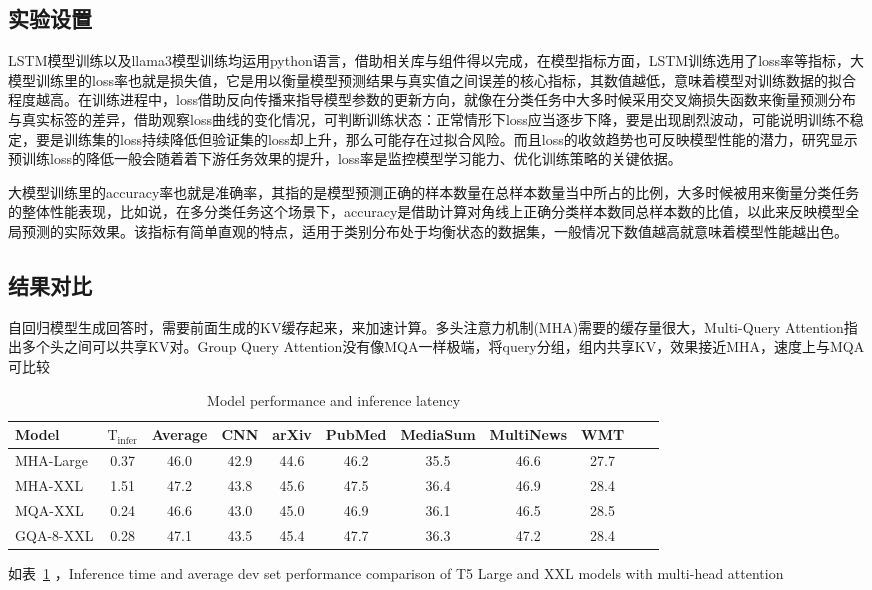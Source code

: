 \documentclass[12pt, a4paper]{article}
\begin{document}
\subsection{实验设置}
LSTM模型训练以及llama3模型训练均运用python语言，借助相关库与组件得以完成，在模型指标方面，LSTM训练选用了loss率等指标，大模型训练里的loss率也就是损失值，它是用以衡量模型预测结果与真实值之间误差的核心指标，其数值越低，意味着模型对训练数据的拟合程度越高。在训练进程中，loss借助反向传播来指导模型参数的更新方向，就像在分类任务中大多时候采用交叉熵损失函数来衡量预测分布与真实标签的差异，借助观察loss曲线的变化情况，可判断训练状态：正常情形下loss应当逐步下降，要是出现剧烈波动，可能说明训练不稳定，要是训练集的loss持续降低但验证集的loss却上升，那么可能存在过拟合风险。而且loss的收敛趋势也可反映模型性能的潜力，研究显示预训练loss的降低一般会随着着下游任务效果的提升，loss率是监控模型学习能力、优化训练策略的关键依据。


大模型训练里的accuracy率也就是准确率，其指的是模型预测正确的样本数量在总样本数量当中所占的比例，大多时候被用来衡量分类任务的整体性能表现，比如说，在多分类任务这个场景下，accuracy是借助计算对角线上正确分类样本数同总样本数的比值，以此来反映模型全局预测的实际效果。该指标有简单直观的特点，适用于类别分布处于均衡状态的数据集，一般情况下数值越高就意味着模型性能越出色。
\subsection{结果对比}
自回归模型生成回答时，需要前面生成的KV缓存起来，来加速计算。多头注意力机制(MHA)需要的缓存量很大，Multi-Query Attention指出多个头之间可以共享KV对。Group Query Attention没有像MQA一样极端，将query分组，组内共享KV，效果接近MHA，速度上与MQA可比较
\begin{table}[htbp]
\centering
\caption{Model performance and inference latency}
\label{tab:results}
\begin{tabular}{lcccccccccc}
\toprule
Model & $\text{T}_\text{infer}$ & Average & CNN & arXiv & PubMed & MediaSum & MultiNews & WMT  \\
\midrule
MHA-Large & 0.37 & 46.0 & 42.9 & 44.6 & 46.2 & 35.5 & 46.6 & 27.7  \\
MHA-XXL & 1.51 & 47.2 & 43.8 & 45.6 & 47.5 & 36.4 & 46.9 & 28.4  \\
MQA-XXL & 0.24 & 46.6 & 43.0 & 45.0 & 46.9 & 36.1 & 46.5 & 28.5  \\
GQA-8-XXL & 0.28 & 47.1 & 43.5 & 45.4 & 47.7 & 36.3 & 47.2 & 28.4  \\
\bottomrule
\end{tabular}
\end{table}

如表~\ref{tab:results} ，Inference time and average dev set performance comparison of T5 Large and XXL models with multi-head
attention

\newpage

\end{document}
